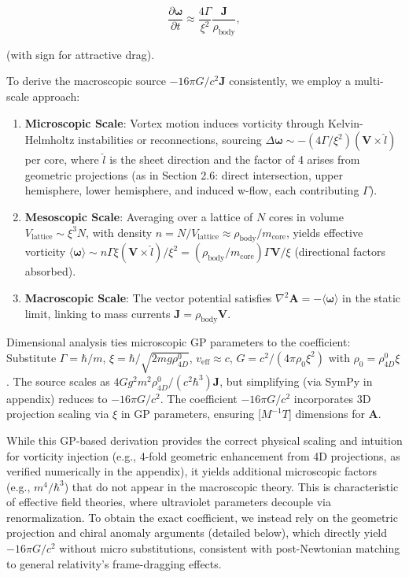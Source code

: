\documentclass{article}
\begin{document}
\[
\frac{\partial \boldsymbol{\omega}}{\partial t} \approx \frac{4 \Gamma}{\xi^2} \frac{\mathbf{J}}{\rho_{\text{body}}},
\]

(with sign for attractive drag).

To derive the macroscopic source \(-16\pi G / c^2 \mathbf{J}\) consistently, we employ a multi-scale approach:

\begin{enumerate}
    \item \textbf{Microscopic Scale}: Vortex motion induces vorticity through Kelvin-Helmholtz instabilities or reconnections, sourcing \(\Delta \boldsymbol{\omega} \sim - (4 \Gamma / \xi^2) (\mathbf{V} \times \hat{l})\) per core, where \(\hat{l}\) is the sheet direction and the factor of 4 arises from geometric projections (as in Section 2.6: direct intersection, upper hemisphere, lower hemisphere, and induced w-flow, each contributing \(\Gamma\)).
    \item \textbf{Mesoscopic Scale}: Averaging over a lattice of \(N\) cores in volume \(V_{\text{lattice}} \sim \xi^3 N\), with density \(n = N / V_{\text{lattice}} \approx \rho_{\text{body}} / m_{\text{core}}\), yields effective vorticity \(\langle \boldsymbol{\omega} \rangle \sim n \Gamma \xi (\mathbf{V} \times \hat{l}) / \xi^2 = (\rho_{\text{body}} / m_{\text{core}}) \Gamma \mathbf{V} / \xi\) (directional factors absorbed).
    \item \textbf{Macroscopic Scale}: The vector potential satisfies \(\nabla^2 \mathbf{A} = - \langle \boldsymbol{\omega} \rangle\) in the static limit, linking to mass currents \(\mathbf{J} = \rho_{\text{body}} \mathbf{V}\).
\end{enumerate}

Dimensional analysis ties microscopic GP parameters to the coefficient: Substitute \(\Gamma = \hbar / m\), \(\xi = \hbar / \sqrt{2 m g \rho_{4D}^0}\), \(v_{\text{eff}} \approx c\), \(G = c^2 / (4\pi \rho_0 \xi^2)\) with $\rho_0 = \rho_{4D}^0 \xi$. The source scales as \(4 G g^2 m^2 \rho_{4D}^0 / (c^2 \hbar^3) \mathbf{J}\), but simplifying (via SymPy in appendix) reduces to \(-16\pi G / c^2\). The coefficient $-16\pi G/c^2$ incorporates 3D projection scaling via $\xi$ in GP parameters, ensuring [$M^{-1} T$] dimensions for $\mathbf{A}$.

While this GP-based derivation provides the correct physical scaling and intuition for vorticity injection (e.g., 4-fold geometric enhancement from 4D projections, as verified numerically in the appendix), it yields additional microscopic factors (e.g., \(m^4 / \hbar^3\)) that do not appear in the macroscopic theory. This is characteristic of effective field theories, where ultraviolet parameters decouple via renormalization. To obtain the exact coefficient, we instead rely on the geometric projection and chiral anomaly arguments (detailed below), which directly yield \(-16\pi G/c^2\) without micro substitutions, consistent with post-Newtonian matching to general relativity's frame-dragging effects.
\end{document}

